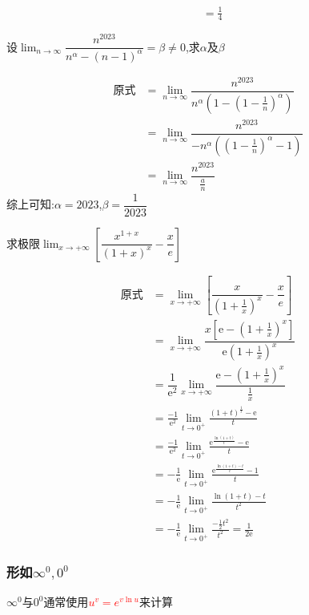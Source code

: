 \documentclass[8pt a4paper, oneside, UTF8]{ctexbook}
\begin{document}
\begin{sloppypar}
\begin{solution}
\begin{align*}
            & = \frac{1}{4}
        \end{align*}
    \end{solution}
    \begin{problem}
        设$\lim_{n\to\infty}\dfrac{n^{2023}}{n^{\alpha}-(n-1)^{\alpha}}=\beta\neq0$,求$\alpha$及$\beta$
    \end{problem}
    \begin{solution}
        \begin{align*}
          \text{原式} & = \lim_{n\to\infty} \dfrac{n^{2023}}{n^\alpha(1-(1-\frac{1}{n})^\alpha)}\\
          & = \lim_{n\to\infty} \dfrac{n^{2023}}{-n^\alpha((1-\frac{1}{n})^\alpha-1)}\\
          & = \lim_{n \to \infty} \dfrac{n^{2023}}{\frac{a}{n}}
        \end{align*}
        综上可知:$\alpha =2023$,$\beta=\dfrac{1}{2023}$
    \end{solution}
    \begin{problem}
        求极限$\lim_{x\to+\infty}[\dfrac{x^{1+x}}{\left(1+x\right)^x}-\dfrac xe]$
    \end{problem}
    \begin{solution}
        \begin{align*}
          \text{原式} & =\lim_{x\to+\infty}\left[\dfrac{x}{\left(1+\frac{1}{x}\right)^{x}}-\dfrac{x}{e}\right] \\
          & =\lim_{x\to+\infty}\dfrac{x\left[\mathrm{e}-\left(1+\frac{1}{x}\right)^{x}\right]}{\mathrm{e}\left(1+\frac{1}{x}\right)^{x}} \\
          & =\dfrac1{\mathrm{e}^2}\lim_{x\to+\infty}\dfrac{\mathrm{e}-\left(1+\frac1x\right)^x}{\frac1x} \\
          & = \frac{-1}{\mathrm{e}^2}\lim_{t\to0^+}\frac{(1+t)^{\frac1t}-\mathrm{e}}t\\
          & =\frac{-1}{\mathrm{e}^2}\lim_{t\to0^+}\frac{\mathrm{e}^{\frac{\ln(1+t)}t}-\mathrm{e}}t\\
          & = -\frac1{\mathrm{e}}\lim_{t\to0^+}\frac{\mathrm{e}^{\frac{\ln(1+t)-t}t}-1}t\\
          & = -\frac{1}{\mathrm{e}}\lim_{t\to0^{+}}\frac{\ln(1+t)-t}{t^{2}} \\
          & =-\frac1{\mathrm{e}}\operatorname*{lim}_{t\to0^+}\frac{-\frac12t^2}{t^2}=\frac1{2\mathrm{e}}
        \end{align*}
    \end{solution}
    \subsubsection{形如$\infty^0,0^0$}
          $\infty ^0$与$0^0$通常使用\textcolor{red}{$ u^v=e^{v \ln u}$}来计算

\end{sloppypar}
\end{document}
